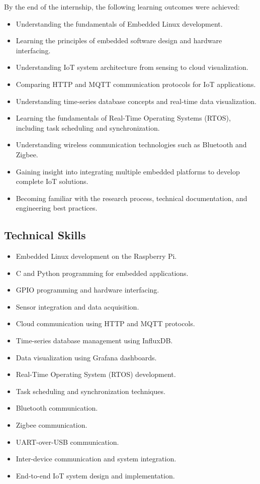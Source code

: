 \documentclass[conference]{IEEEtran}
\begin{document}
By the end of the internship, the following learning outcomes were achieved:

\begin{itemize}
    \item Understanding the fundamentals of Embedded Linux development.
    \item Learning the principles of embedded software design and hardware interfacing.
    \item Understanding IoT system architecture from sensing to cloud visualization.
    \item Comparing HTTP and MQTT communication protocols for IoT applications.
    \item Understanding time-series database concepts and real-time data visualization.
    \item Learning the fundamentals of Real-Time Operating Systems (RTOS), including task scheduling and synchronization.
    \item Understanding wireless communication technologies such as Bluetooth and Zigbee.
    \item Gaining insight into integrating multiple embedded platforms to develop complete IoT solutions.
    \item Becoming familiar with the research process, technical documentation, and engineering best practices.
\end{itemize}

\subsection{Technical Skills}

\begin{itemize}
    \item Embedded Linux development on the Raspberry Pi.
    \item C and Python programming for embedded applications.
    \item GPIO programming and hardware interfacing.
    \item Sensor integration and data acquisition.
    \item Cloud communication using HTTP and MQTT protocols.
    \item Time-series database management using InfluxDB.
    \item Data visualization using Grafana dashboards.
    \item Real-Time Operating System (RTOS) development.
    \item Task scheduling and synchronization techniques.
    \item Bluetooth communication.
    \item Zigbee communication.
    \item UART-over-USB communication.
    \item Inter-device communication and system integration.
    \item End-to-end IoT system design and implementation.
\end{itemize}
\end{document}
